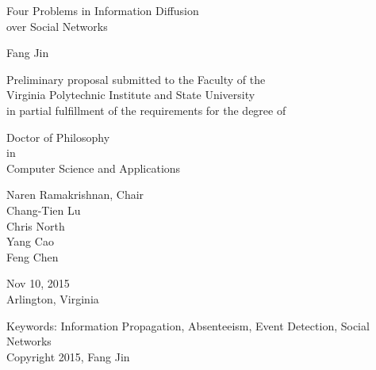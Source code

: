 \documentclass[12pt,dvips]{report}
\begin{document}
\thispagestyle{empty}
\begin{center}

{\Large
Four Problems in Information Diffusion \\
over Social Networks
}


\vfill

Fang Jin

\vfill

Preliminary proposal submitted to the Faculty of the \\
Virginia Polytechnic Institute and State University \\
in partial fulfillment of the requirements for the degree of

\vfill

Doctor of Philosophy \\
in \\
Computer Science and Applications

\vfill

Naren Ramakrishnan, Chair \\
Chang-Tien Lu \\
Chris North \\
Yang Cao \\
Feng Chen

\vfill

Nov 10, 2015 \\
Arlington, Virginia

\vfill

Keywords: Information Propagation, Absenteeism, Event Detection, Social Networks
\\
Copyright 2015, Fang Jin

\end{center}

\pagebreak
\end{document}
